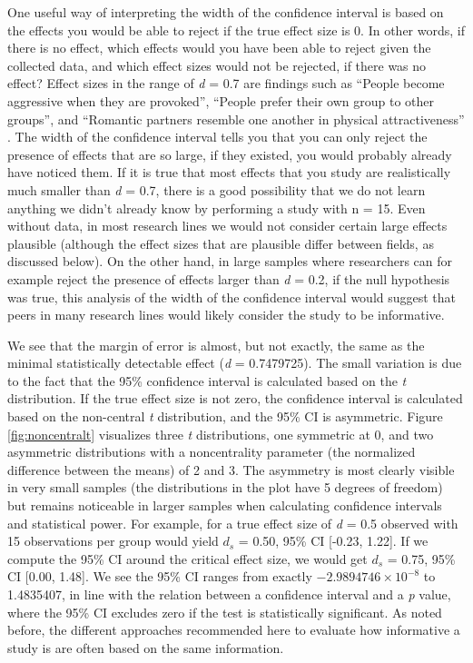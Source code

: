 \documentclass[
]{krantz}
\begin{document}
One useful way of interpreting the width of the confidence interval is based on the effects you would be able to reject if the true effect size is 0. In other words, if there is no effect, which effects would you have been able to reject given the collected data, and which effect sizes would not be rejected, if there was no effect? Effect sizes in the range of \emph{d} = 0.7 are findings such as ``People become aggressive when they are provoked'', ``People prefer their own group to other groups'', and ``Romantic partners resemble one another in physical attractiveness'' \citep{richard_one_2003}. The width of the confidence interval tells you that you can only reject the presence of effects that are so large, if they existed, you would probably already have noticed them. If it is true that most effects that you study are realistically much smaller than \emph{d} = 0.7, there is a good possibility that we do not learn anything we didn't already know by performing a study with n = 15. Even without data, in most research lines we would not consider certain large effects plausible (although the effect sizes that are plausible differ between fields, as discussed below). On the other hand, in large samples where researchers can for example reject the presence of effects larger than \emph{d} = 0.2, if the null hypothesis was true, this analysis of the width of the confidence interval would suggest that peers in many research lines would likely consider the study to be informative.

We see that the margin of error is almost, but not exactly, the same as the minimal statistically detectable effect (\emph{d} = 0.7479725). The small variation is due to the fact that the 95\% confidence interval is calculated based on the \emph{t} distribution. If the true effect size is not zero, the confidence interval is calculated based on the non-central \emph{t} distribution, and the 95\% CI is asymmetric. Figure \ref{fig:noncentralt} visualizes three \emph{t} distributions, one symmetric at 0, and two asymmetric distributions with a noncentrality parameter (the normalized difference between the means) of 2 and 3. The asymmetry is most clearly visible in very small samples (the distributions in the plot have 5 degrees of freedom) but remains noticeable in larger samples when calculating confidence intervals and statistical power. For example, for a true effect size of \emph{d} = 0.5 observed with 15 observations per group would yield \(d_s\) = 0.50, 95\% CI {[}-0.23, 1.22{]}. If we compute the 95\% CI around the critical effect size, we would get \(d_s\) = 0.75, 95\% CI {[}0.00, 1.48{]}. We see the 95\% CI ranges from exactly \ensuremath{-2.9894746\times 10^{-8}} to 1.4835407, in line with the relation between a confidence interval and a \emph{p} value, where the 95\% CI excludes zero if the test is statistically significant. As noted before, the different approaches recommended here to evaluate how informative a study is are often based on the same information.
\end{document}
